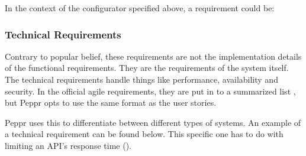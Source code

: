\newline

In the context of the configurator specified above, a requirement could be: \newline

\newline

\subsubsection{Technical Requirements}
Contrary to popular belief, these requirements are not the implementation details of the functional requirements. They are the requirements of the system itself. The technical requirements handle things like performance, availability and security. In the official agile requirements, they are put in to a summarized list \cite{agileTechnicalRequirements}, but Peppr opts to use the same format as the user stories. \newline


\newline

Peppr uses this to differentiate between different types of systems. An example of a technical requirement can be found below. This specific one has to do with limiting an API's response time (\cite{responseTimes}).

\newline

